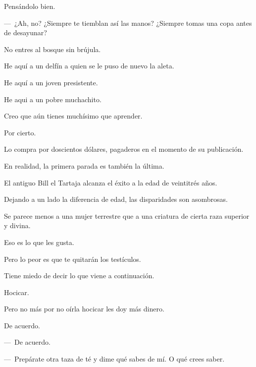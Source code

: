 \sk
Pensándolo bien. 

\sk
---~¿Ah, no? ¿Siempre te tiemblan así las manos? ¿Siempre tomas una copa antes de desayunar?\nb{}

\sk
No entres al bosque sin brújula. 

\sk
He aquí a un delfín a quien se le puso de nuevo la aleta. 

\sk
He aquí a un joven presistente. 

\sk
He aqui a un pobre muchachito. 

\sk
Creo que aún tienes muchísimo que aprender. 

\sk
Por cierto. 

\sk
Lo compra por doscientos dólares, pagaderos en el momento de su publica\-ción. 

\sk
En realidad, la primera parada es también la última.\nb{}

\sk
El antiguo Bill el Tartaja alcanza el éxito a la edad de veintitrés años. 

\sk
 Dejando a un lado la diferencia de edad, las disparidades son asombrosas. \nb{}

\sk
Se parece menos a una mujer terrestre que a una criatura de cierta raza superior y divina. \nb{}

\sk
Eso es lo que les gusta. 

\sk
 Pero lo peor es que te quitarán los testículos. \nb{}

\sk
Tiene miedo de decir lo que viene a continuación. 

\sk
Hocicar. 

\sk
Pero no más por no oírla hocicar les doy más dinero. 

\sk
De acuerdo. 

\sk
---~De acuerdo.

---~Prepárate otra taza de té y dime qué sabes de mí. O qué crees saber. 


